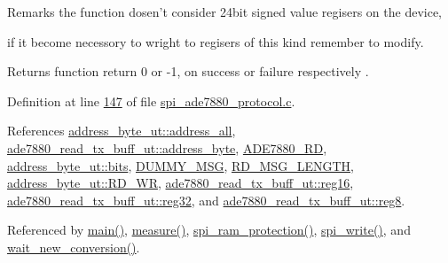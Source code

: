 \begin{DoxyRemark}{Remarks}
the function dosen't consider 24bit signed value regisers on the device, \par
 if it become necessory to wright to regisers of this kind remember to modify.
\end{DoxyRemark}
\begin{DoxyReturn}{Returns}
function return 0 or -\/1, on success or failure respectively . 

 
\end{DoxyReturn}


Definition at line \hyperlink{a00040_source_l00147}{147} of file \hyperlink{a00040_source}{spi\-\_\-ade7880\-\_\-protocol.\-c}.



References \hyperlink{a00041_source_l00023}{address\-\_\-byte\-\_\-ut\-::address\-\_\-all}, \hyperlink{a00041_source_l00146}{ade7880\-\_\-read\-\_\-tx\-\_\-buff\-\_\-ut\-::address\-\_\-byte}, \hyperlink{a00041_source_l00012}{A\-D\-E7880\-\_\-\-R\-D}, \hyperlink{a00011_ae121725fb28cc26495969d71e0e0d42e}{address\-\_\-byte\-\_\-ut\-::bits}, \hyperlink{a00041_source_l00014}{D\-U\-M\-M\-Y\-\_\-\-M\-S\-G}, \hyperlink{a00041_source_l00015}{R\-D\-\_\-\-M\-S\-G\-\_\-\-L\-E\-N\-G\-T\-H}, \hyperlink{a00041_source_l00026}{address\-\_\-byte\-\_\-ut\-::\-R\-D\-\_\-\-W\-R}, \hyperlink{a00041_source_l00150}{ade7880\-\_\-read\-\_\-tx\-\_\-buff\-\_\-ut\-::reg16}, \hyperlink{a00041_source_l00151}{ade7880\-\_\-read\-\_\-tx\-\_\-buff\-\_\-ut\-::reg32}, and \hyperlink{a00041_source_l00149}{ade7880\-\_\-read\-\_\-tx\-\_\-buff\-\_\-ut\-::reg8}.



Referenced by \hyperlink{a00035_source_l00198}{main()}, \hyperlink{a00042_source_l00040}{measure()}, \hyperlink{a00040_source_l00343}{spi\-\_\-ram\-\_\-protection()}, \hyperlink{a00040_source_l00221}{spi\-\_\-write()}, and \hyperlink{a00035_source_l00122}{wait\-\_\-new\-\_\-conversion()}.


